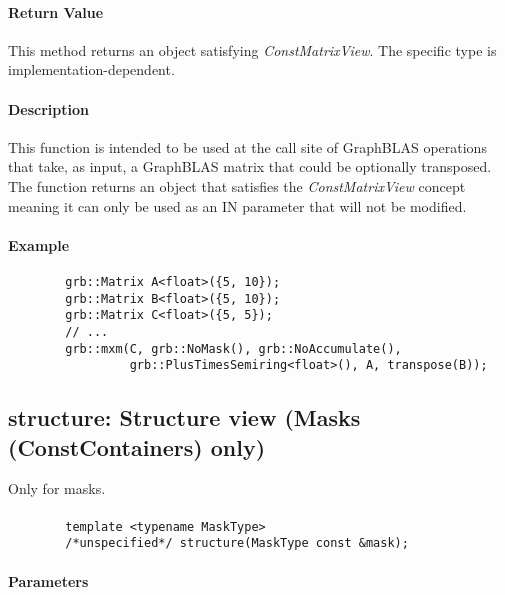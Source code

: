 \paragraph{Return Value}

This method returns an object satisfying \emph{ConstMatrixView}.  The specific type is
implementation-dependent.

\paragraph{Description}

This function is intended to be used at the call site of GraphBLAS operations that take, 
as input, a GraphBLAS matrix that could be optionally transposed.  The function returns an
object that satisfies the \emph{ConstMatrixView} concept meaning it can only be used as an
{\sf IN} parameter that will not be modified.

\paragraph{Example}

\begin{verbatim}
        grb::Matrix A<float>({5, 10});
        grb::Matrix B<float>({5, 10});
        grb::Matrix C<float>({5, 5});
        // ...
        grb::mxm(C, grb::NoMask(), grb::NoAccumulate(), 
                 grb::PlusTimesSemiring<float>(), A, transpose(B));
\end{verbatim}


\subsection{{\sf structure}: Structure view (Masks (ConstContainers) only)}

Only for masks.  

\paragraph{\syntax}

\begin{verbatim}
        template <typename MaskType>
        /*unspecified*/ structure(MaskType const &mask);
\end{verbatim}

\paragraph{Parameters}

